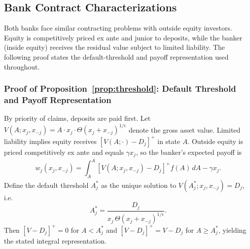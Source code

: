 \documentclass[12pt]{article}
\begin{document}
\subsection{Bank Contract Characterizations}
Both banks face similar contracting problems with outside equity investors. Equity is competitively priced ex ante and junior to deposits, while the banker (inside equity) receives the residual value subject to limited liability. The following proof states the default-threshold and payoff representation used throughout.

\subsubsection{Proof of Proposition~\ref{prop:threshold}: Default Threshold and Payoff Representation}
\label{app:proof-threshold}
By priority of claims, deposits are paid first. Let $V(A;x_j,x_{-j}) = A \cdot x_{j} \cdot \Theta(x_{j}+x_{-j})^{1/\epsilon}$ denote the gross asset value. Limited liability implies equity receives $[V(A;\cdot)-D_j]^+$ in state $A$. Outside equity is priced competitively ex ante and equals $\gamma x_j$, so the banker's expected payoff is
\begin{equation}
w_j(x_j,x_{-j}) = \int_{\underline{A}}^{\overline{A}}[V(A;x_j,x_{-j})-D_j]^+ f(A)\,dA - \gamma x_j.
\end{equation}
Define the default threshold $A_j^*$ as the unique solution to $V(A_j^*;x_j,x_{-j})=D_j$, i.e.
\begin{equation}
A_j^* = \frac{D_j}{x_j\,\Theta(x_j+x_{-j})^{1/\epsilon}}.
\end{equation}
Then $[V-D_j]^+=0$ for $A<A_j^*$ and $[V-D_j]^+=V-D_j$ for $A\ge A_j^*$, yielding the stated integral representation.
\end{document}
